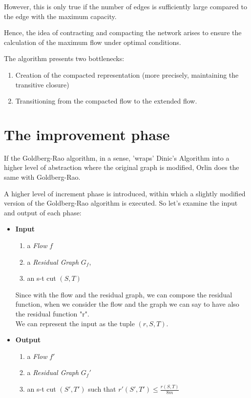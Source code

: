     However, this is only true if the number of edges is sufficiently large compared to the edge with the maximum capacity.  
    
    Hence, the idea of contracting and compacting the network arises to ensure the calculation of the maximum flow under optimal conditions.

    The algorithm presents two bottlenecks:
    \begin{enumerate}
        \item Creation of the compacted representation (more precisely, maintaining the transitive closure)
        \item Transitioning from the compacted flow to the extended flow.
    \end{enumerate}

\section{The improvement phase}
If the Goldberg-Rao algorithm, in a sense, 'wraps' Dinic's Algorithm into a higher level of abstraction where the original graph is modified, Orlin does the same with Goldberg-Rao.

A higher level of increment phase is introduced, within which a slightly modified version of the Goldberg-Rao algorithm is executed.
So let's examine the input and output of each phase:

\begin{itemize}[itemsep=0.5ex]
    \item \textbf{Input}
    \begin{enumerate}
        \item a \textit{Flow} \(f\)
        \item a \textit{Residual Graph} \(G_f\), 
        \item an s-t cut \((S,T)\)
    \end{enumerate}
    Since with the flow and the residual graph, we can compose the residual function, when we consider the flow and the graph we can say to have also the residual function "r". \\
    We can represent the input as the tuple \((r, S, T)\).
    
    \item \textbf{Output}
    \begin{enumerate}
        \item a \textit{Flow} \(f'\)
        \item a \textit{Residual Graph} \(G_f'\)
        \item an s-t cut \((S', T')\) such that \(r'(S', T') \leq \frac{r(S, T)}{8m}\)
    \end{enumerate}
\end{itemize}

